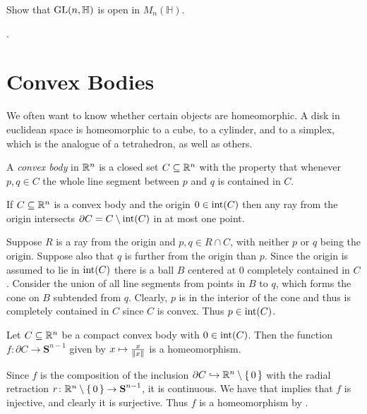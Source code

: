 \documentclass[letterpaper, 11pt, oneside]{book}
\begin{document}
\begin{exercise}
  Show that $\operatorname{GL}(n, \mathbb{H})$ is open in $M_{n}(\mathbb{H})$.
\end{exercise}
\begin{pf}
  .
\end{pf}

\clearpage

\chapter{Convex Bodies}

We often want to know whether certain objects are homeomorphic.
A disk in euclidean space is homeomorphic to a cube, to a cylinder, and to a simplex, which is the analogue of a tetrahedron, as well as others.

\begin{defn}
  A \emph{convex body} in $\mathbb{R}^{n}$ is a closed set $C \subseteq \mathbb{R}^{n}$ with the property that whenever $p, q \in C$ the whole line segment between $p$ and $q$ is contained in $C$.
\end{defn}

\begin{prop}\label{prop: convex_ray_intersect_boundary}
  If $C \subseteq \mathbb{R}^{n}$ is a convex body and the origin $0 \in \operatorname{int}(C)$ then any ray from the origin intersects $\partial C = C \setminus \operatorname{int}(C)$ in at most one point.
\end{prop}
\begin{pf}
  Suppose $R$ is a ray from the origin and $p, q \in R \cap C$, with neither $p$ or $q$ being the origin.
  Suppose also that $q$ is further from the origin than $p$.
  Since the origin is assumed to lie in $\operatorname{int}(C)$ there is a ball $B$ centered at $0$ completely contained in $C$.
  Consider the union of all line segments from points in $B$ to $q$, which forms the cone on $B$ subtended from $q$.
  Clearly, $p$ is in the interior of the cone and thus is completely contained in $C$ since $C$ is convex.
  Thus $p \in \operatorname{int}(C)$.
\end{pf}

\begin{prop}\label{prop: homeo_boundry_to_sphere}
  Let $C \subseteq \mathbb{R}^{n}$ be a compact convex body with $0 \in \operatorname{int}(C)$.
  Then the function $f\colon \partial C \to \textbf{S}^{n - 1}$ given by $x \mapsto \frac{x}{\norm{x}}$ is a homeomorphism.
\end{prop}
\begin{pf}
  Since $f$ is the composition of the inclusion $\partial C \into \R^{n} \setminus \set{0}$ with the radial retraction $r\colon \mathbb{R}^{n} \setminus \set{0} \to \textbf{S}^{n - 1}$, it is continuous.
  We have that  implies that $f$ is injective, and clearly it is surjective.
  Thus $f$ is a homeomorphism by .
\end{pf}
\end{document}
